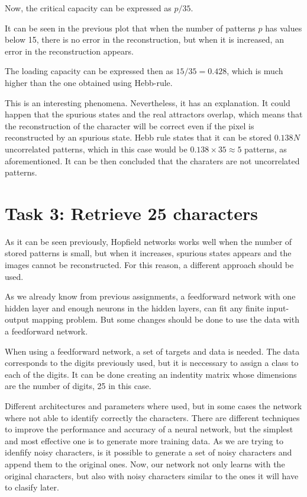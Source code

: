 \documentclass[10pt]{article}
\begin{document}
\begin{multicols}{2}
  Now, the critical capacity can be expressed as $p/35$.

  It can be seen in the previous plot that when the number of patterns
  $p$ has values below 15, there is no error in the reconstruction,
  but when it is increased, an error in the reconstruction appears.

  The loading capacity can be expressed then as $15/35 = 0.428$, which is
  much higher than the one obtained using Hebb-rule.

  This is an interesting phenomena. Nevertheless, it has an explanation. It
  could happen that the spurious states and the real attractors overlap, which
  means that the reconstruction of the character will be correct even if the
  pixel is reconstructed by an spurious state. Hebb rule states that it can be
  stored $0.138N$ uncorrelated patterns, which in this case would be
  $0.138 \times 35 \approx 5$ patterns, as aforementioned. It can be then concluded that
  the charaters are not uncorrelated patterns.    
  
  \section*{Task 3: Retrieve 25 characters}
  As it can be seen previously, Hopfield networks works well when the number
  of stored patterns is small, but when it increases, spurious states appears
  and the images cannot be reconstructed. For this reason, a different approach
  should be used.

  As we already know from previous assignments, a feedforward
  network with one hidden layer and enough neurons in the hidden layers,
  can fit any finite input-output mapping problem. But some changes
  should be done to use the data with a feedforward network.

  When using a feedforward network, a set of targets and data is needed.
  The data corresponds to the digits previously used, but it is neccessary to
  assign a class to each of the digits. It can be done creating an indentity matrix
  whose dimensions are the number of digits, 25 in this case.

  Different architectures and parameters where used, but in some cases the network where not
  able to identify correctly the characters. There are different techniques to improve
  the performance and accuracy of a neural network, but the simplest and most effective
  one is to generate more training data. As we are trying to idenfify noisy characters,
  is it possible to generate a set of noisy characters and append them to the original ones.
  Now, our network not only learns with the original characters, but also with noisy characters
  similar to the ones it will have to clasify later.


\end{multicols}
\end{document}
